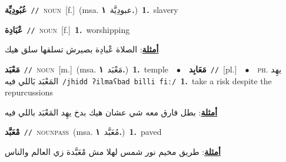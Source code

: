 \documentclass[10pt,a4paper,twoside]{article} %
\begin{document}
\begin{multicols}{2}
{\setlength\topsep{0pt}\textbf{\foreignlanguage{arabic}{عُبُودِيِّة}}\ {\color{gray}\texttt{//}\color{black}}\ \textsc{noun}\ [f.]\ \color{gray}(msa. \foreignlanguage{arabic}{عبودِيَّة}~\foreignlanguage{arabic}{\textbf{١.}})\color{black}\ \textbf{1.}~slavery\ } \vspace{2mm}

{\setlength\topsep{0pt}\textbf{\foreignlanguage{arabic}{عْبَادِة}}\ {\color{gray}\texttt{//}\color{black}}\ \textsc{noun}\ [f.]\ \textbf{1.}~worshipping\  \begin{flushright}\color{gray}\foreignlanguage{arabic}{\textbf{\underline{\foreignlanguage{arabic}{أمثلة}}}: الصلاة عْبادِة بصيرش تسلقها سلق هيك}\end{flushright}\color{black}} \vspace{2mm}

{\setlength\topsep{0pt}\textbf{\foreignlanguage{arabic}{مَعْبَد}}\ {\color{gray}\texttt{//}\color{black}}\ \textsc{noun}\ [m.]\ \color{gray}(msa. \foreignlanguage{arabic}{مَعْبَد}~\foreignlanguage{arabic}{\textbf{١.}})\color{black}\ \textbf{1.}~temple\ \ $\bullet$\ \ \setlength\topsep{0pt}\textbf{\foreignlanguage{arabic}{مَعَابِد}}\ {\color{gray}\texttt{//}\color{black}}\ [pl.]\ \ $\bullet$\ \ \textsc{ph.} \color{gray} \foreignlanguage{arabic}{يهِد المَعْبَد بَاللي فيه}\color{black}\ {\color{gray}\texttt{/{\sffamily jhidd ʔilmaʕbad billi fiː}/}\color{black}}\ \textbf{1.}~take a risk despite the repurcussions\  \begin{flushright}\color{gray}\foreignlanguage{arabic}{\textbf{\underline{\foreignlanguage{arabic}{أمثلة}}}: بطل فارق معه شي عشان هيك بدخ يهِد المَعْبَد باللي فيه}\end{flushright}\color{black}} \vspace{2mm}

{\setlength\topsep{0pt}\textbf{\foreignlanguage{arabic}{مْعَبَّد}}\ {\color{gray}\texttt{//}\color{black}}\ \textsc{noun\textunderscore pass}\ \color{gray}(msa. \foreignlanguage{arabic}{مُعَبَّد}~\foreignlanguage{arabic}{\textbf{١.}})\color{black}\ \textbf{1.}~paved\  \begin{flushright}\color{gray}\foreignlanguage{arabic}{\textbf{\underline{\foreignlanguage{arabic}{أمثلة}}}: طريق مخيم نور شمس لهلا مش مْعَبَّدة زي العالم والناس}\end{flushright}\color{black}} \vspace{2mm}


\end{multicols}
\end{document}
